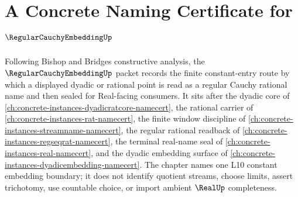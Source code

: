 \chapter{A Concrete Naming Certificate for $\RegularCauchyEmbeddingUp$}
\label{ch:concrete-instances-regular-cauchy-embedding-namecert}

Following Bishop and Bridges constructive analysis, the $\RegularCauchyEmbeddingUp$ packet records the finite constant-entry route by which a displayed dyadic or rational point is read as a regular Cauchy rational name and then sealed for Real-facing consumers. It sits after the dyadic core of \autoref{ch:concrete-instances-dyadicratcore-namecert}, the rational carrier of \autoref{ch:concrete-instances-rat-namecert}, the finite window discipline of \autoref{ch:concrete-instances-streamname-namecert}, the regular rational readback of \autoref{ch:concrete-instances-regseqrat-namecert}, the terminal real-name seal of \autoref{ch:concrete-instances-real-namecert}, and the dyadic embedding surface of \autoref{ch:concrete-instances-dyadicembedding-namecert}. The chapter names one L10 constant embedding boundary; it does not identify quotient streams, choose limits, assert trichotomy, use countable choice, or import ambient $\RealUp$ completeness.

